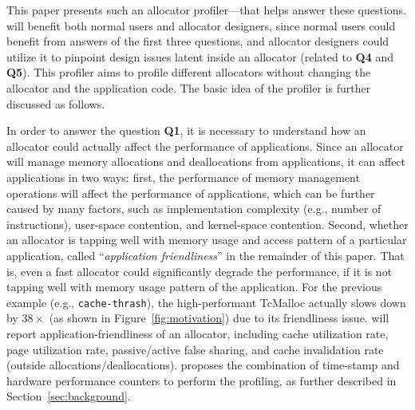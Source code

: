This paper presents such an allocator profiler--\MP{}--that helps answer these questions. \MP{} will benefit both normal users and allocator designers, since normal users could benefit from answers of the first three questions, and allocator designers could utilize it to pinpoint design issues latent inside an allocator (related to \textbf{Q4} and \textbf{Q5}). This profiler aims to profile different allocators without changing the allocator and the application code. The basic idea of the profiler is further discussed as follows. 

In order to answer the question \textbf{Q1}, it is necessary to understand how an allocator could actually affect the performance of applications. Since an allocator will manage memory allocations and deallocations from applications, it can affect applications in two ways: first, the performance of memory management operations will affect the performance of applications, which can be further caused by many factors, such as implementation complexity (e.g., number of instructions), user-space contention, and kernel-space contention. Second, whether an allocator is tapping well with memory usage and access pattern of a particular application, called ``\textit{application friendliness}'' in the remainder of this paper. That is, even a fast allocator could significantly degrade the performance, if it is not tapping well with memory usage pattern of the application. For the previous example (e.g., \texttt{cache-thrash}), the  high-performant TcMalloc actually slows down by $38\times$ (as shown in Figure~\ref{fig:motivation}) due to its friendliness issue. \MP{} will report application-friendliness of an allocator, including cache utilization rate, page utilization rate, passive/active false sharing, and cache invalidation rate (outside allocations/deallocations). \MP{}  proposes the combination of time-stamp and hardware performance counters to perform the profiling, as further described in Section~\ref{sec:background}. 


